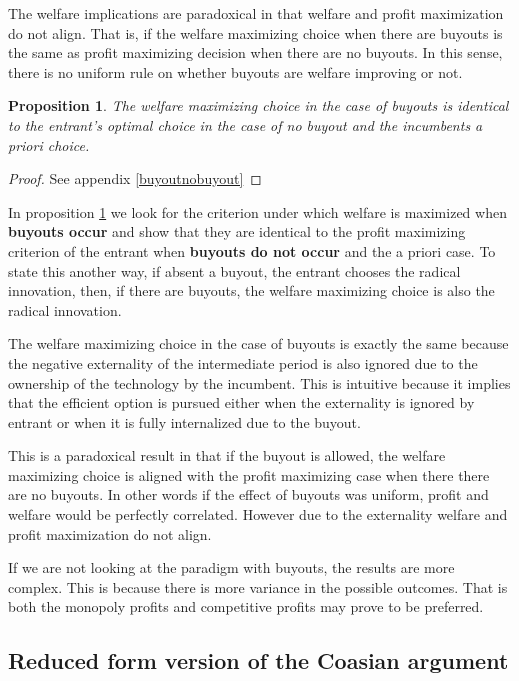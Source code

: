 \documentclass[11pt]{article}
\newtheorem{proposition}{Proposition}
\begin{document}
The welfare implications are paradoxical in that welfare and profit maximization do not align. That is, if the welfare maximizing choice when there are buyouts is the same as profit maximizing decision when there are no buyouts. In this sense, there is no uniform rule on whether buyouts are welfare improving or not. 

\begin{proposition}\label{propwelfare}
The welfare maximizing choice in the case of buyouts is identical to the entrant's optimal choice in the case of no buyout and the incumbents a priori choice. 
\end{proposition}

\begin{proof}
See appendix \ref{buyoutnobuyout}
\end{proof}

In proposition \ref{propwelfare} we look for the criterion under which welfare is maximized when \textbf{ buyouts occur} and show that they are identical to the profit maximizing criterion of the entrant when \textbf{buyouts do not occur} and the a priori case. To state this another way, if absent a buyout, the entrant chooses the radical innovation, then, if there are buyouts, the welfare maximizing choice is also the radical innovation. 

The welfare maximizing choice in the case of buyouts is exactly the same because the negative externality of the intermediate period is also ignored due to the ownership of the technology by the incumbent. This is intuitive because it implies that the efficient option is pursued either when the externality is ignored by entrant or when it is fully internalized due to the buyout.

This is a paradoxical result in that if the buyout is allowed, the welfare maximizing choice is aligned with the profit maximizing case when there there are no buyouts. In other words if the effect of buyouts was uniform, profit and welfare would be perfectly correlated. However due to the externality welfare and profit maximization do not align. 

If we are not looking at the paradigm with buyouts, the results are more complex. This is because there is more variance in the possible outcomes. That is both the monopoly profits and competitive profits may prove to be preferred. 

\subsection*{Reduced form version of the Coasian argument}
\end{document}
